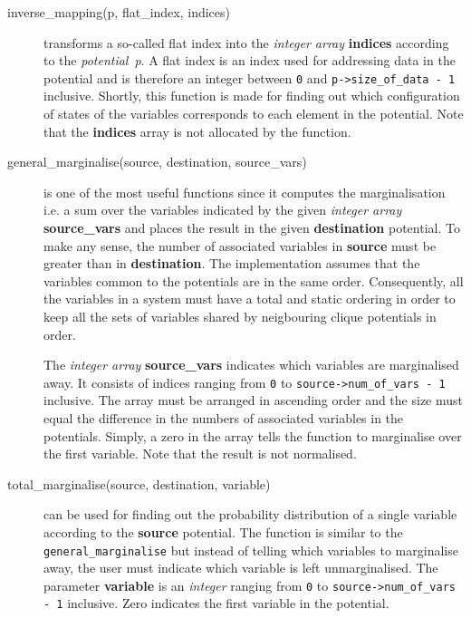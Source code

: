 \documentclass[12pt,a4paper]{report}
\newcommand{\cdatatype}[1]{{\it #1}}
\newcommand{\examplecode}[1]{\texttt{#1}}
\newcommand{\cparameter}[1]{\textbf{#1}}
\newcommand{\cfunction}[1]{\texttt{#1}}
\begin{document}
\begin{description}
\item[inverse\_mapping(p, flat\_index, indices)] transforms a
so-called flat index into the \cdatatype{integer array} 
\cparameter{indices} according to the \cdatatype{potential}~\cdatatype{p}. 
A flat index is an index used for addressing data in the potential and 
is therefore an integer between \examplecode{0} and
\examplecode{p->size\_of\_data - 1} inclusive. Shortly, this function is 
made for finding out which configuration of states of the variables 
corresponds to each element in the potential. Note that the 
\cparameter{indices} array is not allocated by the function.

\item[general\_marginalise(source, destination, source\_vars)] is one
of the most useful functions since it computes the marginalisation
i.e. a sum over the variables indicated by the given 
\cdatatype{integer array} \cparameter{source\_vars} and places the 
result in the given \cparameter{destination} potential. To make any 
sense, the number of associated variables in \cparameter{source} must 
be greater than in \cparameter{destination}. The implementation
assumes that the variables common to the potentials are in the same 
order. Consequently, all the variables in a system must have a total 
and static ordering in order to keep all the sets of variables shared 
by neigbouring clique potentials in order.

The \cdatatype{integer array} \cparameter{source\_vars} indicates which
variables are marginalised away. It consists of indices ranging from
\examplecode{0} to \examplecode{source->num\_of\_vars - 1} inclusive. 
The array must be arranged in ascending order and the size must equal 
the difference in the numbers of associated variables in the potentials. 
Simply, a zero in the array tells the function to marginalise over the 
first variable. Note that the result is not normalised.

\item[total\_marginalise(source, destination, variable)] can be used
for finding out the probability distribution of a single variable
according to the \cparameter{source} potential. The function is
similar to the \cfunction{general\_marginalise} but instead of telling 
which variables to marginalise away, the user must indicate which
variable is left unmarginalised. The parameter \cparameter{variable} is 
an \cdatatype{integer} ranging from \examplecode{0} to
\examplecode{source->num\_of\_vars - 1} inclusive. Zero indicates the 
first variable in the potential.


\end{description}
\end{document}

